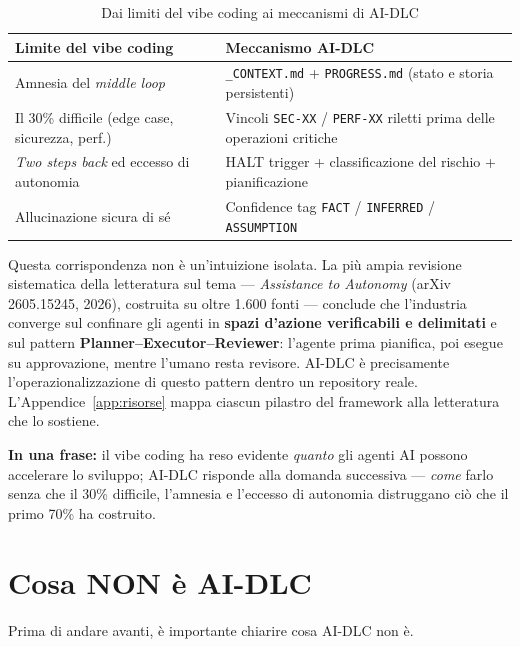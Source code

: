 \begin{table}[htbp]
  \centering
  \begin{tabular}{ll}
    \toprule
    \textbf{Limite del vibe coding} & \textbf{Meccanismo AI-DLC} \\
    \midrule
    Amnesia del \textit{middle loop} & \texttt{\_CONTEXT.md} + \texttt{PROGRESS.md} (stato e storia persistenti) \\
    Il 30\% difficile (edge case, sicurezza, perf.) & Vincoli \texttt{SEC-XX} / \texttt{PERF-XX} riletti prima delle operazioni critiche \\
    \textit{Two steps back} ed eccesso di autonomia & HALT trigger + classificazione del rischio + pianificazione \\
    Allucinazione sicura di sé & Confidence tag \texttt{FACT} / \texttt{INFERRED} / \texttt{ASSUMPTION} \\
    \bottomrule
  \end{tabular}
  \caption{Dai limiti del vibe coding ai meccanismi di AI-DLC}
  \label{tab:01-vibe-vs-aidlc}
\end{table}

Questa corrispondenza non è un'intuizione isolata. La più ampia revisione sistematica della letteratura sul tema --- \textit{Assistance to Autonomy} (arXiv 2605.15245, 2026), costruita su oltre 1.600 fonti --- conclude che l'industria converge sul confinare gli agenti in \textbf{spazi d'azione verificabili e delimitati} e sul pattern \textbf{Planner--Executor--Reviewer}: l'agente prima pianifica, poi esegue su approvazione, mentre l'umano resta revisore. AI-DLC è precisamente l'operazionalizzazione di questo pattern dentro un repository reale. L'Appendice~\ref{app:risorse} mappa ciascun pilastro del framework alla letteratura che lo sostiene.

\begin{notebox}
\textbf{In una frase:} il vibe coding ha reso evidente \textit{quanto} gli agenti AI possono accelerare lo sviluppo; AI-DLC risponde alla domanda successiva --- \textit{come} farlo senza che il 30\% difficile, l'amnesia e l'eccesso di autonomia distruggano ciò che il primo 70\% ha costruito.
\end{notebox}

\section{Cosa NON è AI-DLC}
\label{sec:01-cosa-non-e}

Prima di andare avanti, è importante chiarire cosa AI-DLC non è.

